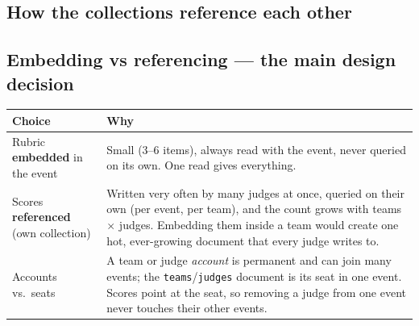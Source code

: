 \documentclass[11pt,a4paper]{article}
\newcommand{\coll}[1]{\texttt{#1}}
\begin{document}
\subsection{How the collections reference each other}
\begin{center}
\end{center}

\subsection{Embedding vs referencing --- the main design decision}
\begin{tabularx}{\linewidth}{@{}p{3.2cm}X@{}}
\toprule
\textbf{Choice} & \textbf{Why}\\
\midrule
Rubric \textbf{embedded} in the event & Small (3--6 items), always read with the event, never queried on its own. One read gives everything. \\
Scores \textbf{referenced} (own collection) & Written very often by many judges at once, queried on their own (per event, per team), and the count grows with teams $\times$ judges. Embedding them inside a team would create one hot, ever-growing document that every judge writes to. \\
Accounts vs.\ seats & A team or judge \emph{account} is permanent and can join many events; the \coll{teams}/\coll{judges} document is its seat in one event. Scores point at the seat, so removing a judge from one event never touches their other events. \\
\bottomrule
\end{tabularx}
\end{document}
